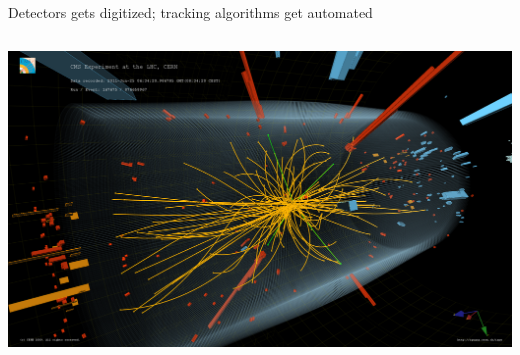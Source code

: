 \documentclass[aspectratio=169]{beamer}
\begin{document}
\begin{frame}{Detectors gets digitized; tracking algorithms get automated}
\begin{columns}
\includegraphics[width=\linewidth]{cms-event.png}
\end{columns}
\end{frame}
\end{document}
